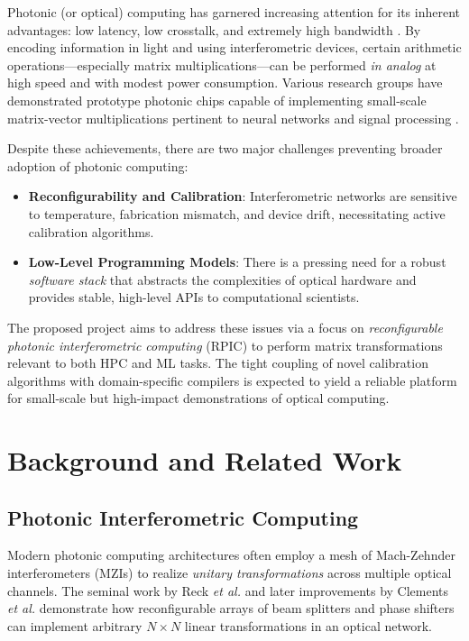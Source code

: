 \documentclass[conference]{IEEEtran}
\begin{document}
Photonic (or optical) computing has garnered increasing attention for its inherent advantages: low latency, low crosstalk, and extremely high bandwidth \cite{miller2017device}. By encoding information in light and using interferometric devices, certain arithmetic operations---especially matrix multiplications---can be performed \emph{in analog} at high speed and with modest power consumption. Various research groups have demonstrated prototype photonic chips capable of implementing small-scale matrix-vector multiplications pertinent to neural networks and signal processing \cite{shen2017deep, harris2018linear}.

Despite these achievements, there are two major challenges preventing broader adoption of photonic computing:
\begin{itemize}
    \item \textbf{Reconfigurability and Calibration}: Interferometric networks are sensitive to temperature, fabrication mismatch, and device drift, necessitating active calibration algorithms.
    \item \textbf{Low-Level Programming Models}: There is a pressing need for a robust \emph{software stack} that abstracts the complexities of optical hardware and provides stable, high-level APIs to computational scientists.
\end{itemize}

The proposed project aims to address these issues via a focus on \emph{reconfigurable photonic interferometric computing} (RPIC) to perform matrix transformations relevant to both HPC and ML tasks. The tight coupling of novel calibration algorithms with domain-specific compilers is expected to yield a reliable platform for small-scale but high-impact demonstrations of optical computing.

\section{Background and Related Work}

\subsection{Photonic Interferometric Computing}
Modern photonic computing architectures often employ a mesh of Mach-Zehnder interferometers (MZIs) to realize \emph{unitary transformations} across multiple optical channels. The seminal work by Reck \emph{et al.} \cite{reck1994experimental} and later improvements by Clements \emph{et al.} \cite{clements2016optimal} demonstrate how reconfigurable arrays of beam splitters and phase shifters can implement arbitrary $N\times N$ linear transformations in an optical network. 
\end{document}
